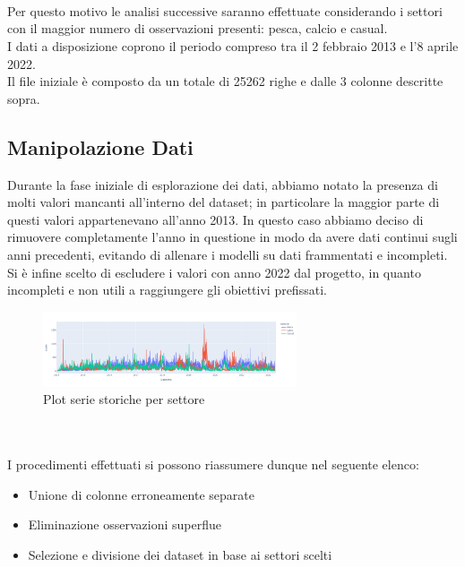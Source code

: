 \documentclass[12pt, a4paper, twocolumn]{article} %
\begin{document}
\\
\\
\\
Per questo motivo le analisi successive saranno effettuate considerando i settori con il maggior numero di osservazioni presenti: pesca, calcio e casual.\\
I dati a disposizione coprono il periodo compreso tra il 2 febbraio 2013 e l'8 aprile 2022.\\
Il file iniziale è composto da un totale di 25262 righe e dalle 3 colonne descritte sopra.

\subsection{Manipolazione Dati}
Durante la fase iniziale di esplorazione dei dati, abbiamo notato la presenza di molti valori mancanti all'interno del dataset; in particolare la maggior parte di questi valori appartenevano all'anno 2013. In questo caso abbiamo deciso di rimuovere completamente l'anno in questione in modo da avere dati continui sugli anni precedenti, evitando di allenare i modelli su dati frammentati e incompleti.\\
Si è infine scelto di escludere i valori con anno 2022 dal progetto, in quanto incompleti e non utili a raggiungere gli obiettivi prefissati.
\begin{figure}
  \caption{Plot serie storiche per settore}
  \begin{center}
    \includegraphics[width=75mm,scale=0.5]{plot_dati_settori.png}
  \end{center}
\end{figure}
\\
\\
I procedimenti effettuati si possono riassumere dunque nel seguente elenco:
\begin{itemize}
	\item Unione di colonne erroneamente separate
	\item Eliminazione osservazioni superflue
	\item Selezione e divisione dei dataset in base ai settori scelti
\end{itemize}
\end{document}
